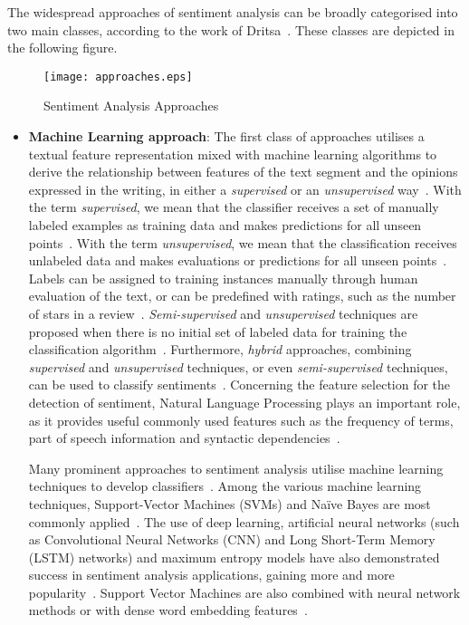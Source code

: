 The widespread approaches of sentiment analysis can be broadly categorised
into two main classes, according to the work of Dritsa~\cite{Dri18}.
These classes are depicted in the following figure.

\begin{figure}[ht]
\centering
\texttt{[image: approaches.eps]}
\caption{Sentiment Analysis Approaches}
\label{fig:approaches}
\end{figure}

\clearpage

\begin{itemize}
 \item \textbf{Machine Learning approach}:
 The first class of approaches utilises a textual feature representation
 mixed with machine learning algorithms
 to derive the relationship between features of the text segment
 and the opinions expressed in the writing,
 in either a \emph{supervised} or an \emph{unsupervised} way~\cite{GSZ13,PLV02}.
 With the term \emph{supervised},
 we mean that the classifier receives a set of manually labeled examples
 as training data and makes predictions for all unseen points~\cite{MRT12}.
 With the term \emph{unsupervised},
 we mean that the classification receives unlabeled data
 and makes evaluations or predictions for all unseen points~\cite{MRT12}.
 Labels can be assigned to training instances manually
 through human evaluation of the text, or can be predefined with ratings,
 such as the number of stars in a review~\cite{GSZ13}.
 \emph{Semi-supervised} and \emph{unsupervised} techniques are proposed
 when there is no initial set of labeled data
 for training the classification algorithm~\cite{HZ11,XGYZ13}.
 Furthermore, \emph{hybrid} approaches,
 combining \emph{supervised} and \emph{unsupervised} techniques,
 or even \emph{semi-supervised} techniques,
 can be used to classify sentiments~\cite{KL14,KB06}.
 Concerning the feature selection for the detection of sentiment,
 Natural Language Processing plays an important role,
 as it provides useful commonly used features
 such as the frequency of terms, part of speech information
 and syntactic dependencies~\cite{SORH15}.
 
 Many prominent approaches to sentiment analysis utilise
 machine learning techniques to develop classifiers~\cite{DLP03,PLV02,ACS08,Gam04}.
 Among the various machine learning techniques,
 Support-Vector Machines (SVMs) and Na\"{i}ve Bayes are most commonly
 applied~\cite{SORH15,GSZ13,PLV02}.
 The use of deep learning, artificial neural networks
 (such as Convolutional Neural Networks (CNN)
 and Long Short-Term Memory (LSTM) networks)
 and maximum entropy models have also demonstrated success
 in sentiment analysis applications, gaining more and more popularity~\cite{GSZ13}.
 Support Vector Machines are also combined with neural network methods
 or with dense word embedding features~\cite{RFN17,GSZ13}.
 

\end{itemize}

